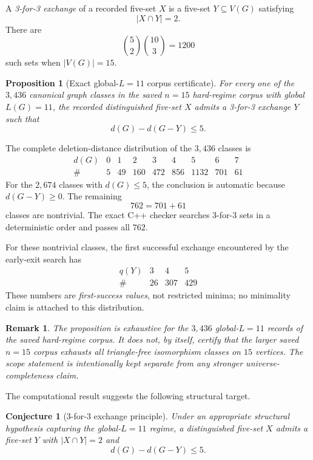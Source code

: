 \documentclass[11pt]{article}
\newtheorem{proposition}{Proposition}
\newtheorem{conjecture}{Conjecture}
\newtheorem{remark}{Remark}
\newcommand{\dd}{d}
\begin{document}
A \emph{3-for-3 exchange} of a recorded five-set $X$ is a five-set
$Y\subseteq V(G)$ satisfying
\[
|X\cap Y|=2.
\]
There are
\[
\binom52\binom{10}{3}=1200
\]
such sets when $|V(G)|=15$.

\begin{proposition}[Exact global-$L=11$ corpus certificate]
For every one of the $3{,}436$ canonical graph classes in the saved
$n=15$ hard-regime corpus with global $L(G)=11$, the recorded distinguished
five-set $X$ admits a 3-for-3 exchange $Y$ such that
\[
\dd(G)-\dd(G-Y)\le5.
\]
\end{proposition}

The complete deletion-distance distribution of the $3{,}436$ classes is
\[
\begin{array}{c|rrrrrrrr}
\dd(G) & 0&1&2&3&4&5&6&7\\ \hline
\#     & 5&49&160&472&856&1132&701&61
\end{array}
\]
For the $2{,}674$ classes with $\dd(G)\le5$, the conclusion is automatic
because $\dd(G-Y)\ge0$.  The remaining
\[
762=701+61
\]
classes are nontrivial.  The exact C++ checker searches 3-for-3 sets in a
deterministic order and passes all $762$.

For these nontrivial classes, the first successful exchange encountered by
the early-exit search has
\[
\begin{array}{c|rrr}
q(Y) & 3&4&5\\ \hline
\#   & 26&307&429
\end{array}
\]
These numbers are \emph{first-success values}, not restricted minima; no
minimality claim is attached to this distribution.

\begin{remark}
The proposition is exhaustive for the $3{,}436$ global-$L=11$ records of
the saved hard-regime corpus.  It does not, by itself, certify that the
larger saved $n=15$ corpus exhausts all triangle-free isomorphism classes
on $15$ vertices.  The scope statement is intentionally kept separate
from any stronger universe-completeness claim.
\end{remark}

The computational result suggests the following structural target.

\begin{conjecture}[3-for-3 exchange principle]
Under an appropriate structural hypothesis capturing the global-$L=11$
regime, a distinguished five-set $X$ admits a five-set $Y$ with
$|X\cap Y|=2$ and
\[
\dd(G)-\dd(G-Y)\le5.
\]
\end{conjecture}
\end{document}
